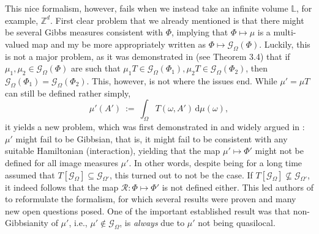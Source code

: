 \documentclass[12pt]{article}
\renewcommand{\d}{\mathrm{d}}
\newcommand{\G}{\mathcal{G}}
\renewcommand{\L}{\mathbb{L}}
\newcommand{\RR}{\mathcal{R}}
\newcommand{\Z}{\mathbb{Z}}
\newcommand{\1}{\mathbbm{1}}
\newcommand{\5}{\vspace{0.5cm}}
\theoremstyle{definition}
\begin{document}
This nice formalism, however, fails when we instead take an infinite volume $\L$, for example, $\Z^d$. First clear problem that we already mentioned is that there might be several Gibbs measures consistent with $\Phi$, implying that $\Phi\mapsto\mu$ is a multi-valued map and my be more appropriately written as $\Phi\mapsto\G_\Omega(\Phi)$. Luckily, this is not a major problem, as it was demonstrated in \cite{EFS} (see Theorem 3.4) that if $\mu_1,\mu_2\in\G_{\Omega}(\Phi)$ are such that $\mu_1 T\in\G_{\Omega}(\Phi_1),\mu_2 T\in\G_{\Omega}(\Phi_2)$, then $\G_{\Omega}(\Phi_1)=\G_{\Omega}(\Phi_2)$. This, however, is not where the issues end. While $\mu'=\mu T$ can still be defined rather simply,
$$\mu'(A') ~:=~ \int_\Omega T(\omega,A')\,\d\mu(\omega),$$
it yields a new problem, which was first demonstrated in \cite{Isr} and widely argued in \cite{EFS}: $\mu'$ might fail to be Gibbsian, that is, it might fail to be consistent with any suitable Hamiltonian (interaction), yielding that the map $\mu'\mapsto\Phi'$ might not be defined for all image measures $\mu'$. In other words, despite being for a long time assumed that $T[\G_\Omega]\subseteq\G_{\Omega'}$, this turned out to not be the case. If $T[\G_\Omega]\not\subseteq\G_{\Omega'}$, it indeed follows that the map $\RR:\Phi\mapsto\Phi'$ is not defined either. This led authors of \cite{EFS} to reformulate the formalism, for which several results were proven and many new open questions posed. One of the important established result was that non-Gibbsianity of $\mu'$, i.e., $\mu'\notin\G_\Omega$, is \textit{always} due to $\mu'$ not being quasilocal. \\
\end{document}
